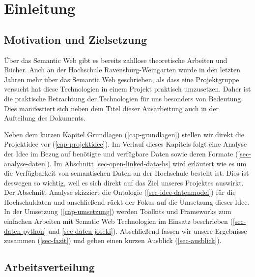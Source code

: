 \chapter{Einleitung}
\label{cap-einleitung}
\section{Motivation und Zielsetzung} %

Über das Semantic Web gibt es bereits zahllose theoretische Arbeiten und Bücher. Auch an der Hochschule Ravensburg-Weingarten wurde in den letzten Jahren mehr über das Semantic Web geschrieben, als dass eine Projektgruppe versucht hat diese Technologien in einem Projekt praktisch umzusetzen. Daher ist die praktische Betrachtung der Technologien für uns besonders von Bedeutung. Dies manifestiert sich neben dem Titel dieser Ausarbeitung auch in der Aufteilung des Dokuments.

Neben dem kurzen Kapitel Grundlagen (\ref{cap-grundlagen}) stellen wir direkt die Projektidee vor (\ref{cap-projektidee}). Im Verlauf dieses Kapitels folgt eine Analyse der Idee im Bezug auf benötigte und verfügbare Daten sowie deren Formate (\ref{sec-analyse-daten}). Im Abschnitt \ref{sec-open-linked-data-hs} wird erläutert wie es um die Verfügbarkeit von semantischen Daten an der Hochschule bestellt ist. Dies ist deswegen so wichtig, weil es sich direkt auf das Ziel unseres Projektes auswirkt. Der Abschnitt Analyse skizziert die \gls{Ontologie} (\ref{sec-idee-datenmodel}) für die Hochschuldaten und anschließend rückt der Fokus auf die Umsetzung dieser Idee. In der Umsetzung (\ref{cap-umsetzung}) werden Toolkits und Frameworks zum einfachen Arbeiten mit Sematic Web Technologien im Einsatz beschrieben (\ref{sec-daten-python} und \ref{sec-daten-joseki}). Abschließend fassen wir unsere Ergebnisse zusammen (\ref{sec-fazit}) und geben einen kurzen Ausblick (\ref{sec-ausblick}).


\section{Arbeitsverteilung}

